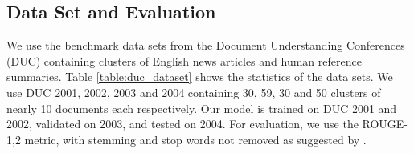 \documentclass[11pt,a4paper]{article}
\begin{document}
\subsection{Data Set and Evaluation}
We use the benchmark data sets from the Document Understanding Conferences (DUC) containing clusters of English news articles and human reference summaries.
Table \ref{table:duc_dataset} shows the statistics of the data sets.
We use DUC 2001, 2002, 2003 and 2004 containing 30, 59, 30 and 50 clusters of nearly 10 documents each respectively.
Our model is trained on DUC 2001 and 2002, validated on 2003, and tested on 2004.
For evaluation, we use the ROUGE-1,2 metric, with stemming and stop words not removed as suggested by . 

\begin{table}[t]
\centering
\hspace{-1mm}
\caption{Statistics for DUC Multi-Document Summarization Data Sets.}
\label{table:duc_dataset}
\vspace{-5mm}
\end{table}
\end{document}
